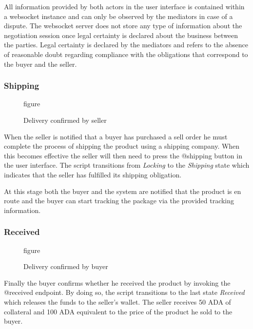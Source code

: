 \documentclass[12pt]{article}
\begin{document}
All information provided by both actors in the user interface is contained within a websocket instance and can only be observed by the mediators in case of a dispute.
The websocket server does not store any type of information about the negotiation session once legal certainty is declared about the business between the parties.
Legal certainty is declared by the mediators and refers to the absence of reasonable doubt regarding compliance with the obligations that correspond to the buyer and the seller.


\subsubsection { Shipping }


\begin{figure}[ht]
  \centering
figure
  \caption{Delivery confirmed by seller}  
  \label{fig:delivered}
\end{figure}


When the seller is notified that a buyer has purchased a sell order he must complete the process of shipping the product using a shipping company. When this becomes effective the seller will then need to press the @shipping button in the user interface.
The script transitions from \emph{Locking} to the \emph{Shipping} state which indicates that the seller has fulfilled its shipping obligation.

At this stage both the buyer and the system are notified that the product is en route and the buyer can start tracking the package via the provided tracking information.

\subsubsection { Received }

\begin{figure}[ht]
  \centering
figure
  \caption{Delivery confirmed by buyer}
  \label{fig:delivered}
\end{figure}

Finally the buyer confirms whether he received the product by invoking the @received endpoint. By doing so, the script transitions to the last state \emph{Received} which releases the funds to the seller's wallet. The seller receives 50 ADA of collateral and 100 ADA equivalent to the price of the product he sold to the buyer.
\\
\\
\\
\\
\\
\\
\\
\\
\\
\\
\\
\\
\\
\\
\\
\\
\\
\end{document}
